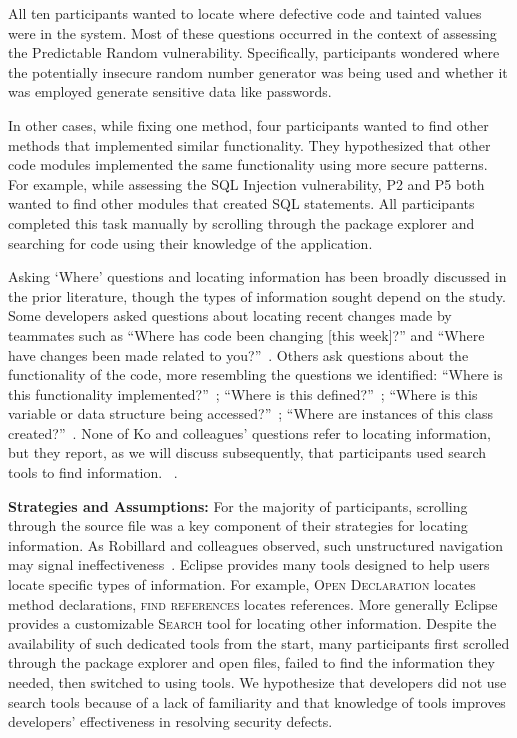 \documentclass[10pt,journal,compsoc]{IEEEtran}
\begin{document}
All ten participants wanted to locate where defective code and tainted values were in the system. 
Most of these questions occurred in the context of assessing the Predictable Random vulnerability.
Specifically, participants wondered where the potentially insecure random number generator was being used and whether it was employed generate sensitive data like passwords.

In other cases, while fixing one method, four participants wanted to find other methods that implemented similar functionality.
They hypothesized that other code modules implemented the same functionality using more secure patterns. 
For example, while assessing the SQL Injection vulnerability, P2 and P5 both wanted to find other modules that created SQL statements.
All participants completed this task manually by scrolling through the package explorer and searching for code using their knowledge of the application.

Asking `Where' questions and locating information has been broadly discussed in the prior literature, though the types of information sought depend on the study.
Some developers asked questions about locating recent changes made by teammates such as ``Where has code been changing [this week]?'' and
``Where have changes been made related to you?''~\cite{fritz2010using}.
Others ask questions about the functionality of the code, more resembling the questions we identified:
``Where is this functionality implemented?''~\cite{latoza2010hard};  
``Where is this defined?''~\cite{latoza2010hard};
``Where is this variable or data structure being accessed?''~\cite{sillito2008asking};
``Where are instances of this class created?''~\cite{sillito2008asking}.
None of Ko and colleagues' questions refer to locating information, but they report, as we will discuss subsequently, that participants used search tools to find information. ~\cite{Ko:2007:information}.

\textbf{Strategies and Assumptions:}
For the majority of participants, scrolling through the source file was a key component of their strategies for locating information.
As Robillard and colleagues observed, such unstructured navigation may signal ineffectiveness~\cite{robillard2004effective}.
Eclipse provides many tools designed to help users locate specific types of information.
For example, \textsc{Open Declaration} locates method declarations, \textsc{find references} locates references.
More generally Eclipse provides a customizable \textsc{Search} tool for locating other information.
Despite the availability of such dedicated tools from the start, many participants first scrolled through the package explorer and open files, failed to find the information they needed, then switched to using tools. 
We hypothesize that developers did not use search tools because of a lack of familiarity and that knowledge of tools improves developers' effectiveness in resolving security defects.
\end{document}
